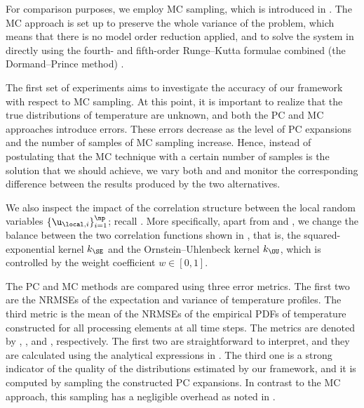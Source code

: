 For comparison purposes, we employ \ac{MC} sampling, which is introduced in
. The \ac{MC} approach is set up to preserve the whole variance of
the problem, which means that there is no model order reduction applied, and to
solve the system in  directly using the fourth-
and fifth-order Runge--Kutta formulae combined (the Dormand--Prince method)
\cite{press2007}.


The first set of experiments aims to investigate the accuracy of our framework
with respect to \ac{MC} sampling. At this point, it is important to realize that
the true distributions of temperature are unknown, and both the \ac{PC} and
\ac{MC} approaches introduce errors. These errors decrease as the level \lc of
\ac{PC} expansions and the number of samples \no of \ac{MC} sampling increase.
Hence, instead of postulating that the \ac{MC} technique with a certain number
of samples is the solution that we should achieve, we vary both \lc and \no and
monitor the corresponding difference between the results produced by the two
alternatives.

We also inspect the impact of the correlation structure between the local random
variables $\{ \u_{\local, i} \}_{i = 1}^\np$; recall
. More specifically, apart from \lc and \no,
we change the balance between the two correlation functions shown in
, that is, the squared-exponential kernel $k_\SE$ and
the Ornstein--Uhlenbeck kernel $k_\OU$, which is controlled by the weight
coefficient $w \in [0, 1]$.

The \ac{PC} and \ac{MC} methods are compared using three error metrics. The
first two are the \acp{NRMSE} of the expectation and variance of temperature
profiles. The third metric is the mean of the \acp{NRMSE} of the empirical
\acp{PDF} of temperature constructed for all processing elements at all time
steps. The metrics are denoted by \error{\expectation}, \error{\variance}, and
, respectively. The first two are straightforward to interpret, and
they are calculated using the analytical expressions in .
The third one is a strong indicator of the quality of the distributions
estimated by our framework, and it is computed by sampling the constructed
\ac{PC} expansions. In contrast to the \ac{MC} approach, this sampling has a
negligible overhead as noted in .

